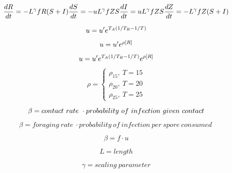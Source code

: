 \documentclass[
]{article}
\begin{document}
\[
\frac{dR}{dt} = -L^{\gamma} fR(S+I)\\
\frac{dS}{dt} = -u L^{\gamma} fZS\\
\frac{dI}{dt} = u L^{\gamma} fZS\\
\frac{dZ}{dt} = -L^{\gamma} fZ(S+I)\\
\]

\[
u = u'e^{T_{A}(1/T_{R}-1/T)}\\
\]

\[
u = u'e^{\rho[R]}\\
\]

\[
u = u'e^{T_{A}(1/T_{R}-1/T)}e^{\rho[R]}\\
\]

\[
\rho = 
\begin{cases}
  \rho_{15},\ T=15
  \\
  \rho_{20},\ T=20
  \\
  \rho_{25},\ T=25
\end{cases}
\]

\[
\beta = contact\ rate\ \cdot probability\ of\ infection\ given\ contact\\
\]

\[
\beta = foraging\ rate\ \cdot probability\ of\ infection\ per\ spore\ consumed\
\]

\[
\beta = f \cdot u
\]

\[
L = length
\]

\[
\gamma = scaling\ parameter
\]
\end{document}

